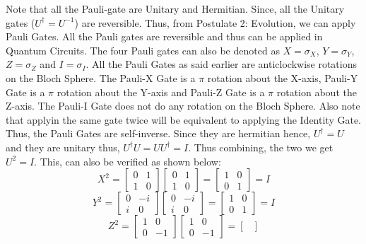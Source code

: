 \begin{importantnote}
Note that all the Pauli-gate are Unitary and Hermitian. Since, all the Unitary gates ($U^{\dagger}=U^{-1}$)
are reversible. Thus, from Postulate 2: Evolution, we can apply Pauli Gates. All the Pauli gates are reversible 
and thus can be applied in Quantum Circuits. The four Pauli gates can also be denoted as $X=\sigma_X$, $Y=\sigma_Y$, $Z=\sigma_Z$ and $I=\sigma_I$.
All the Pauli Gates as said earlier are anticlockwise rotations on the Bloch Sphere. The Pauli-X Gate is a $\pi$ rotation about the X-axis,
Pauli-Y Gate is a $\pi$ rotation about the Y-axis and Pauli-Z Gate is a $\pi$ rotation about the Z-axis. The Pauli-I Gate does not do any rotation on the Bloch Sphere.
Also note that applyin the same gate twice will be equivalent to applying the Identity Gate. Thus, the Pauli Gates are self-inverse. Since they are hermitian hence, $U^{\dagger}=U$ and 
they are unitary thus, $U^{\dagger}U=UU^{\dagger}=I$. Thus combining, the two we get $U^2=I$.
This, can also be verified as shown below:
\[
    X^2=\begin{bmatrix}
        0 & 1 \\
        1 & 0
    \end{bmatrix}\begin{bmatrix}
        0 & 1 \\
        1 & 0
    \end{bmatrix}=\begin{bmatrix}
        1 & 0 \\
        0 & 1
    \end{bmatrix}=I
\]
\[
    Y^2=\begin{bmatrix}
        0 & -i \\
        i & 0
    \end{bmatrix}\begin{bmatrix}
        0 & -i \\
        i & 0
    \end{bmatrix}=\begin{bmatrix}
        1 & 0 \\
        0 & 1
    \end{bmatrix}=I
\]
\[
    Z^2=\begin{bmatrix}
        1 & 0 \\
        0 & -1
    \end{bmatrix}\begin{bmatrix}
        1 & 0 \\
        0 & -1
    \end{bmatrix}=\begin{bmatrix}

\end{bmatrix}\]
\end{importantnote}
